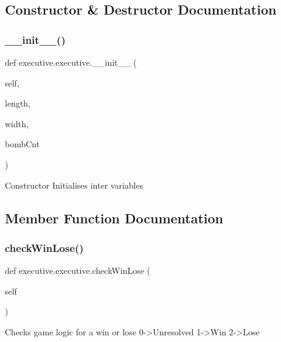 \subsection{Constructor \& Destructor Documentation}
\mbox{\label{classexecutive_1_1executive_a7456b110c146af5391ea26770144b461}} 
\subsubsection{\texorpdfstring{\+\_\+\+\_\+init\+\_\+\+\_\+()}{\_\_init\_\_()}}
{\footnotesize\ttfamily def executive.\+executive.\+\_\+\+\_\+init\+\_\+\+\_\+ (\begin{DoxyParamCaption}\item[{}]{self,  }\item[{}]{length,  }\item[{}]{width,  }\item[{}]{bomb\+Cnt }\end{DoxyParamCaption})}

\begin{DoxyVerb}Constructor
Initialises inter variables
\end{DoxyVerb}
 

\subsection{Member Function Documentation}
\mbox{\label{classexecutive_1_1executive_a944d536ab4e80df2ef4c0494d7ea9f19}} 
\subsubsection{\texorpdfstring{check\+Win\+Lose()}{checkWinLose()}}
{\footnotesize\ttfamily def executive.\+executive.\+check\+Win\+Lose (\begin{DoxyParamCaption}\item[{}]{self }\end{DoxyParamCaption})}

\begin{DoxyVerb}Checks game logic for a win or lose
0->Unresolved
1->Win
2->Lose
\end{DoxyVerb}
 \mbox{\label{classexecutive_1_1executive_abe92cddf119081cac6c747858df061d7}} 
